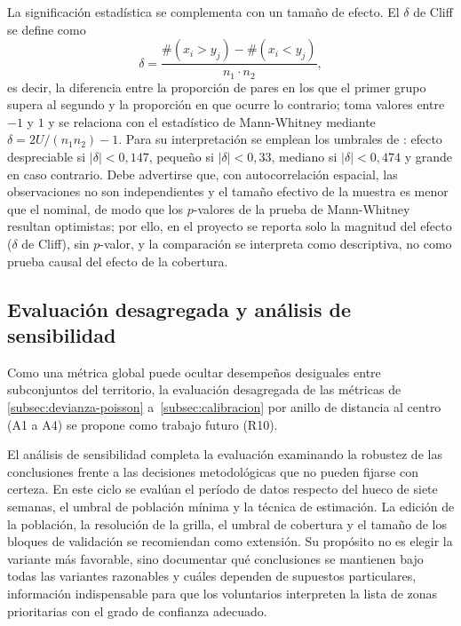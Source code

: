 La significación estadística se complementa con un tamaño de efecto. El $\delta$ de Cliff
\parencite{cliff1993} se define como
\[
  \delta = \frac{\#(x_i > y_j) - \#(x_i < y_j)}{n_1 \cdot n_2},
\]
es decir, la diferencia entre la proporción de pares en los que el primer grupo supera al
segundo y la proporción en que ocurre lo contrario; toma valores entre $-1$ y $1$ y se
relaciona con el estadístico de Mann-Whitney mediante $\delta = 2U / (n_1 n_2) - 1$. Para su
interpretación se emplean los umbrales de \textcite{romano2006}: efecto despreciable si
$\lvert\delta\rvert < 0{,}147$, pequeño si $\lvert\delta\rvert < 0{,}33$, mediano si
$\lvert\delta\rvert < 0{,}474$ y grande en caso contrario. Debe advertirse que, con
autocorrelación espacial, las observaciones no son independientes y el tamaño efectivo de la
muestra es menor que el nominal, de modo que los $p$-valores de la prueba de Mann-Whitney
resultan optimistas; por ello, en el proyecto se reporta solo la magnitud del efecto
($\delta$ de Cliff), sin $p$-valor, y la comparación se interpreta como descriptiva, no como
prueba causal del efecto de la cobertura.

\subsection{Evaluación desagregada y análisis de sensibilidad}
\label{subsec:evaluacion-desagregada}

Como una métrica global puede ocultar desempeños desiguales entre subconjuntos del
territorio, la evaluación desagregada de las métricas de \ref{subsec:devianza-poisson}
a~\ref{subsec:calibracion} por anillo de distancia al centro (A1 a A4) se propone como
trabajo futuro (R10).

El análisis de sensibilidad completa la evaluación examinando la robustez de las
conclusiones frente a las decisiones metodológicas que no pueden fijarse con certeza. En
este ciclo se evalúan el período de datos respecto del hueco de siete semanas, el umbral de
población mínima y la técnica de estimación. La edición de la población, la resolución de
la grilla, el umbral de cobertura y el tamaño de los bloques de validación se recomiendan
como extensión. Su propósito no es elegir la variante más favorable, sino documentar qué
conclusiones se mantienen bajo todas las variantes razonables y cuáles dependen de supuestos
particulares, información indispensable para que los voluntarios interpreten la lista de
zonas prioritarias con el grado de confianza adecuado.
